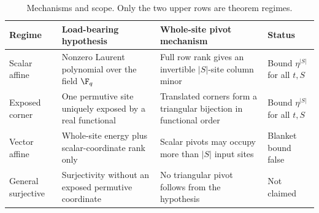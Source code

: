 \begin{table}[t]
  \centering
  \small
  \setlength{\tabcolsep}{3.4pt}
  \renewcommand{\arraystretch}{1.13}
  \caption{Mechanisms and scope.  Only the two upper rows are theorem
  regimes.}
  \label{tab:mechanisms}
  \begin{tabularx}{\textwidth}{@{}
    >{\RaggedRight\arraybackslash}p{25mm}
    >{\RaggedRight\arraybackslash}p{38mm}
    >{\RaggedRight\arraybackslash}X
    >{\RaggedRight\arraybackslash}p{31mm}@{}}
    \toprule
    Regime & Load-bearing hypothesis & Whole-site pivot mechanism
      & Status \\
    \midrule
    Scalar affine
      & Nonzero Laurent polynomial over the field $\F_q$
      & Full row rank gives an invertible $|S|$-site column minor
      & Bound $\eta^{|S|}$ for all $t,S$ \\
    Exposed corner
      & One permutive site uniquely exposed by a real functional
      & Translated corners form a triangular bijection in functional order
      & Bound $\eta^{|S|}$ for all $t,S$ \\
    Vector affine
      & Whole-site energy plus scalar-coordinate rank only
      & Scalar pivots may occupy more than $|S|$ input sites
      & Blanket bound false \\
    General surjective
      & Surjectivity without an exposed permutive coordinate
      & No triangular pivot follows from the hypothesis
      & Not claimed \\
    \bottomrule
  \end{tabularx}
\end{table}

